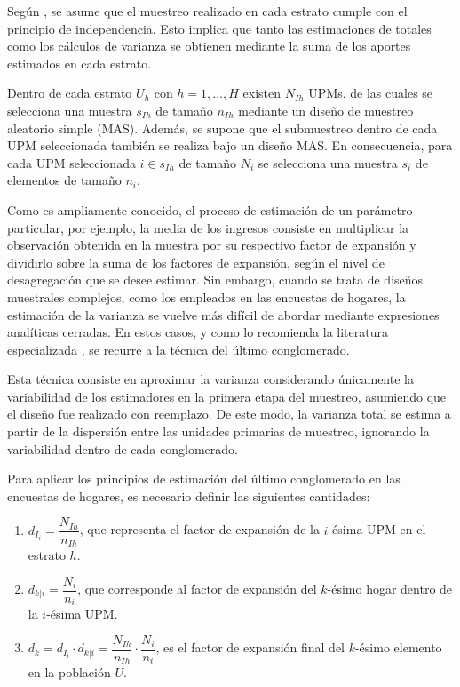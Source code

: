 \documentclass[
  spanish,
  12pt,
]{book}
\begin{document}
Según \citet{cochran1977sampling}, se asume que el muestreo realizado en cada estrato cumple con el principio de independencia. Esto implica que tanto las estimaciones de totales como los cálculos de varianza se obtienen mediante la suma de los aportes estimados en cada estrato.

Dentro de cada estrato \(U_h\) con \(h=1,\ldots, H\) existen \(N_{Ih}\) UPMs, de las cuales se selecciona una muestra \(s_{Ih}\) de tamaño \(n_{Ih}\) mediante un diseño de muestreo aleatorio simple (MAS). Además, se supone que el submuestreo dentro de cada UPM seleccionada también se realiza bajo un diseño MAS. En consecuencia, para cada UPM seleccionada \(i\in s_{Ih}\) de tamaño \(N_i\) se selecciona una muestra \(s_i\) de elementos de tamaño \(n_i\).

Como es ampliamente conocido, el proceso de estimación de un parámetro particular, por ejemplo, la media de los ingresos consiste en multiplicar la observación obtenida en la muestra por su respectivo factor de expansión y dividirlo sobre la suma de los factores de expansión, según el nivel de desagregación que se desee estimar. Sin embargo, cuando se trata de diseños muestrales complejos, como los empleados en las encuestas de hogares, la estimación de la varianza se vuelve más difícil de abordar mediante expresiones analíticas cerradas. En estos casos, y como lo recomienda la literatura especializada \citet{hansen1956control}, se recurre a la técnica del último conglomerado.

Esta técnica consiste en aproximar la varianza considerando únicamente la variabilidad de los estimadores en la primera etapa del muestreo, asumiendo que el diseño fue realizado con reemplazo. De este modo, la varianza total se estima a partir de la dispersión entre las unidades primarias de muestreo, ignorando la variabilidad dentro de cada conglomerado.

Para aplicar los principios de estimación del último conglomerado en las encuestas de hogares, es necesario definir las siguientes cantidades:

\begin{enumerate}
\def\labelenumi{\arabic{enumi}.}
\item
  \(d_{I_i} = \dfrac{N_{Ih}}{n_{Ih}}\), que representa el factor de expansión de la \(i\)-ésima UPM en el estrato \(h\).
\item
  \(d_{k|i} = \dfrac{N_{i}}{n_{i}}\), que corresponde al factor de expansión del \(k\)-ésimo hogar dentro de la \(i\)-ésima UPM.
\item
  \(d_k = d_{I_i} \cdot d_{k|i} = \dfrac{N_{Ih}}{n_{Ih}} \cdot \dfrac{N_{i}}{n_{i}}\), es el factor de expansión final del \(k\)-ésimo elemento en la población \(U\).
\end{enumerate}
\end{document}

